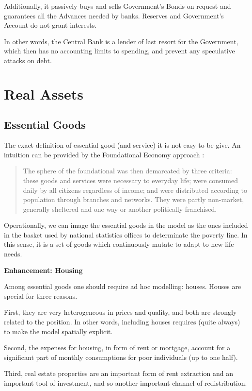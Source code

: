\documentclass[a4paper, headings=standardclasses]{scrartcl}
\newenvironment{enh}[1][]{\begin{framed}\noindent\textbf{Enhancement: #1}\par}{\end{framed}}
\begin{document}
Additionally, it passively buys and sells Government's Bonds on request and guarantees all the Advances needed by banks. Reserves and Government's Account do not grant interests.

In other words, the Central Bank is a lender of last resort for the Government, which then has no accounting limits to spending, and prevent any speculative attacks on debt.

\section{Real Assets}
\subsection{Essential Goods}
The exact definition of essential good (and service) it is not easy to be give. An intuition can be provided by the Foundational Economy approach \parencite{arcidiacono2018}: \begin{quote}
	The sphere of the foundational was then demarcated by three criteria: these goods and services were necessary to everyday life; were consumed daily by all citizens regardless of income; and were distributed according to population through branches and networks. They were partly non-market, generally sheltered and one way or another politically franchised.
\end{quote}

Operationally, we can image the essential goods in the model as the ones included in the basket used by national statistics offices to determinate the poverty line. In this sense, it is a set of goods which continuously mutate to adapt to new life needs.

\begin{enh}[Housing]
	Among essential goods one should require ad hoc modelling: houses. Houses are special for three reasons.

	First, they are very heterogeneous in prices and quality, and both are strongly related to the position. In other words, including houses requires (quite always) to make the model spatially explicit.

	Second, the expenses for housing, in form of rent or mortgage, account for a significant part of monthly consumptions for poor individuals (up to one half).

	Third, real estate properties are an important form of rent extraction and an important tool of investment, and so another important channel of redistribution.
\end{enh}
\end{document}
